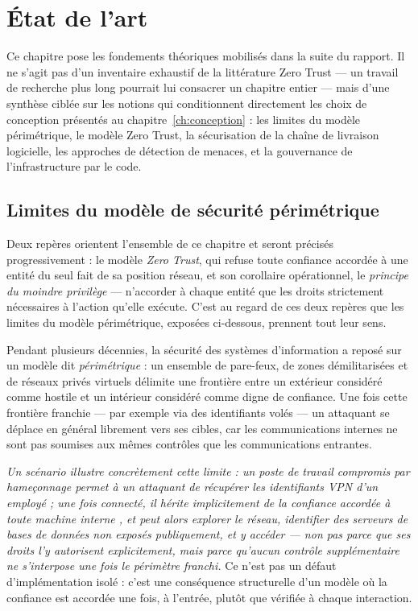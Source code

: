 \chapter{État de l'art}
\label{ch:etat-art}

Ce chapitre pose les fondements théoriques mobilisés dans la suite du rapport. Il ne s'agit
pas d'un inventaire exhaustif de la littérature Zero Trust --- un travail de recherche plus
long pourrait lui consacrer un chapitre entier --- mais d'une synthèse ciblée sur les
notions qui conditionnent directement les choix de conception présentés au
chapitre~\ref{ch:conception} : les limites du modèle périmétrique, le modèle Zero Trust, la
sécurisation de la chaîne de livraison logicielle, les approches de détection de menaces, et
la gouvernance de l'infrastructure par le code.

\section{Limites du modèle de sécurité périmétrique}

Deux repères orientent l'ensemble de ce chapitre et seront précisés progressivement : le
modèle \emph{Zero Trust}, qui refuse toute confiance accordée à une entité du seul fait de sa
position réseau, et son corollaire opérationnel, le \emph{principe du moindre privilège} ---
n'accorder à chaque entité que les droits strictement nécessaires à l'action qu'elle exécute.
C'est au regard de ces deux repères que les limites du modèle périmétrique, exposées
ci-dessous, prennent tout leur sens.

Pendant plusieurs décennies, la sécurité des systèmes d'information a reposé sur un modèle
dit \emph{périmétrique} : un ensemble de pare-feux, de zones démilitarisées et de réseaux
privés virtuels délimite une frontière entre un extérieur considéré comme hostile et un
intérieur considéré comme digne de confiance. Une fois cette frontière franchie --- par
exemple via des identifiants volés --- un attaquant se déplace en général librement vers ses
cibles, car les communications internes ne sont pas soumises aux mêmes contrôles que les
communications entrantes.

\textit{Un scénario illustre concrètement cette limite : un poste de travail compromis par
hameçonnage permet à un attaquant de récupérer les identifiants VPN d'un employé ; une fois
connecté, il hérite implicitement de la confiance accordée à toute machine \og interne \fg{},
et peut alors explorer le réseau, identifier des serveurs de bases de données non exposés
publiquement, et y accéder --- non pas parce que ses droits l'y autorisent explicitement, mais
parce qu'aucun contrôle supplémentaire ne s'interpose une fois le périmètre franchi.} Ce n'est
pas un défaut d'implémentation isolé : c'est une conséquence structurelle d'un modèle où la
confiance est accordée une fois, à l'entrée, plutôt que vérifiée à chaque interaction.

